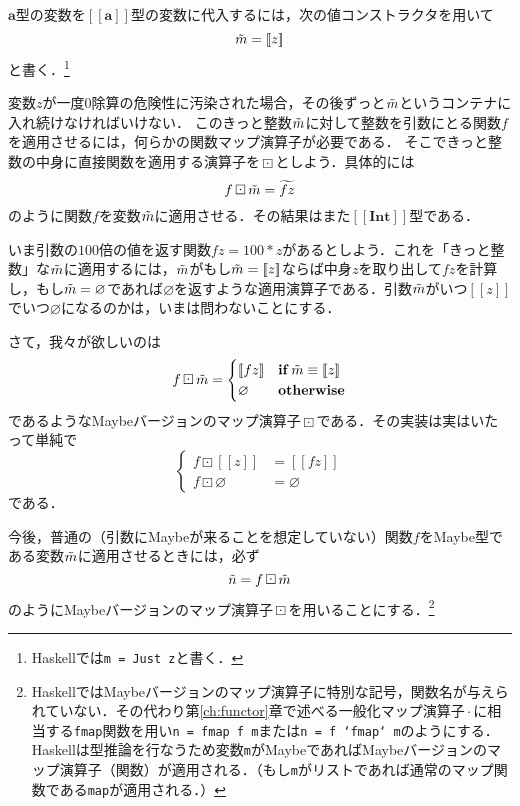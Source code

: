 \documentclass[twocolumn]{jsbook}
\def\[{[\![}
\def\]{]\!]}
\newcommand{\code}[1]{\texttt{#1}}
\newcommand{\hsklType}[1]{\textbf{#1}}
\DeclareMathOperator{\hsklFmap}{\cdot}
\DeclareMathOperator{\hsklMaybeMap}{\boxdot}
\newcommand{\hsklInt}{\hsklType{Int}}
\newcommand{\hsklNothing}{\varnothing}
\newcommand{\hsklJust}[1]{\[#1\]}
\newcommand{\hsklMaybe}[1]{\Tilde{#1}}
\newcommand{\hsklMaybeW}[1]{\widetilde{#1}}
\newcommand{\hsklMaybeType}[1]{\[#1\]}
\newcommand{\mathKeyword}[1]{\mathbf{#1}}
\DeclareMathOperator{\mathIf}{\mathKeyword{if}}
\newcommand{\mathOtherwise}{\mathKeyword{otherwise}}
\begin{document}
$\hsklType{a}$型の変数を$\hsklMaybeType{\hsklType{a}}$型の変数に代入するには，次の値コンストラクタを用いて$$\hsklMaybe{m}=\hsklJust{z}$$と書く．\footnote{Haskellでは\code{m = Just z}と書く．}

変数$z$が一度$0$除算の危険性に汚染された場合，その後ずっと$\hsklMaybe{m}$というコンテナに入れ続けなければいけない．
このきっと整数$\hsklMaybe{m}$に対して整数を引数にとる関数$f$を適用させるには，何らかの関数マップ演算子が必要である．
そこできっと整数の中身に直接関数を適用する演算子を$\hsklMaybeMap$としよう．具体的には$$f\hsklMaybeMap\hsklMaybe{m}=\hsklMaybeW{fz}$$のように関数$f$を変数$\hsklMaybe{m}$に適用させる．その結果はまた$\hsklMaybeType{\hsklInt}$型である．

いま引数の$100$倍の値を返す関数$fz=100*z$があるとしよう．これを「きっと整数」な$\hsklMaybe{m}$に適用するには，$\hsklMaybe{m}$がもし$\hsklMaybe{m}=\hsklJust{z}$ならば中身$z$を取り出して$fz$を計算し，もし$\hsklMaybe{m}=\hsklNothing$であれば$\hsklNothing$を返すような適用演算子である．引数$\hsklMaybe{m}$がいつ$\hsklJust{z}$でいつ$\hsklNothing$になるのかは，いまは問わないことにする．

さて，我々が欲しいのは
\begin{equation*}
f\hsklMaybeMap\hsklMaybe{m}=\begin{cases}
\hsklJust{fz}&\mathIf\hsklMaybe{m}\equiv\hsklJust{z}\\
\hsklNothing&\mathOtherwise
\end{cases}
\end{equation*}
であるようなMaybeバージョンのマップ演算子$\hsklMaybeMap$である．その実装は実はいたって単純で
\begin{equation*}
\left\{
\begin{split}
f\hsklMaybeMap\hsklJust{z}&=\hsklJust{fz}\\
f\hsklMaybeMap\hsklNothing&=\hsklNothing
\end{split}
\right.
\end{equation*}
である．

今後，普通の（引数にMaybeが来ることを想定していない）関数$f$をMaybe型である変数$\hsklMaybe{m}$に適用させるときには，必ず$$\hsklMaybe{n}=f\hsklMaybeMap\hsklMaybe{m}$$のようにMaybeバージョンのマップ演算子$\hsklMaybeMap$を用いることにする．\footnote{HaskellではMaybeバージョンのマップ演算子に特別な記号，関数名が与えられていない．その代わり第\ref{ch:functor}章で述べる一般化マップ演算子$\hsklFmap$に相当する\code{fmap}関数を用い\code{n = fmap f m}または\code{n = f `fmap` m}のようにする．Haskellは型推論を行なうため変数\code{m}がMaybeであればMaybeバージョンのマップ演算子（関数）が適用される．（もし\code{m}がリストであれば通常のマップ関数である\code{map}が適用される．）}
\end{document}
